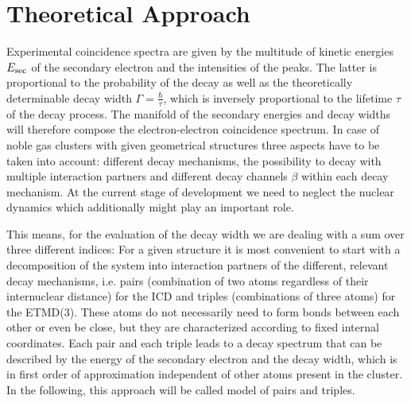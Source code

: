 \section{Theoretical Approach}
%
Experimental coincidence spectra are given by the multitude of
kinetic energies $E_{\rm sec}$ of the secondary electron
and the intensities of the peaks. The latter is proportional to the
probability of the decay as well as the theoretically determinable
decay width $\Gamma=\frac{\hbar}{\tau}$,
which is inversely proportional to the lifetime $\tau$ of the decay process.
The manifold of the
secondary energies and decay widths will therefore compose the electron-electron
coincidence spectrum.
In case of noble gas clusters
with given geometrical structures three aspects have to be taken into account:
different decay mechanisms, the possibility to decay with multiple
interaction partners and different decay channels $\beta$ within
each decay mechanism.
At the current stage of development we need to neglect the nuclear dynamics which
additionally might play an important role.


This means, for the evaluation of the decay width we are dealing with a sum over three different indices: 
For a given structure it is most convenient to
start with a decomposition of the system into interaction partners of
the different, relevant decay mechanisms, i.e. pairs (combination of two atoms regardless
of their internuclear distance) for the ICD and triples (combinations of three atoms)
for the ETMD(3).
These atoms do not necessarily need to form bonds between each other or
even be close, but they are characterized according to fixed internal
coordinates. 
Each pair and each triple leads to a decay spectrum that can be described by the energy of the secondary electron and the decay width, which is in first order of approximation independent of other atoms present in the cluster.
In the following, this approach will be called model of pairs and triples.


